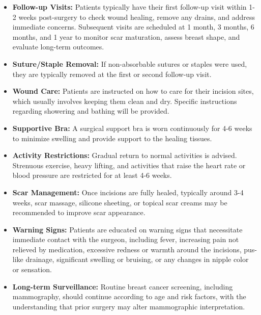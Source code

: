 \begin{itemize}
  \item \textbf{Follow-up Visits:} Patients typically have their first follow-up visit within 1-2 weeks post-surgery to check wound healing, remove any drains, and address immediate concerns. Subsequent visits are scheduled at 1 month, 3 months, 6 months, and 1 year to monitor scar maturation, assess breast shape, and evaluate long-term outcomes.
  \item \textbf{Suture/Staple Removal:} If non-absorbable sutures or staples were used, they are typically removed at the first or second follow-up visit.
  \item \textbf{Wound Care:} Patients are instructed on how to care for their incision sites, which usually involves keeping them clean and dry. Specific instructions regarding showering and bathing will be provided.
  \item \textbf{Supportive Bra:} A surgical support bra is worn continuously for 4-6 weeks to minimize swelling and provide support to the healing tissues.
  \item \textbf{Activity Restrictions:} Gradual return to normal activities is advised. Strenuous exercise, heavy lifting, and activities that raise the heart rate or blood pressure are restricted for at least 4-6 weeks.
  \item \textbf{Scar Management:} Once incisions are fully healed, typically around 3-4 weeks, scar massage, silicone sheeting, or topical scar creams may be recommended to improve scar appearance.
  \item \textbf{Warning Signs:} Patients are educated on warning signs that necessitate immediate contact with the surgeon, including fever, increasing pain not relieved by medication, excessive redness or warmth around the incisions, pus-like drainage, significant swelling or bruising, or any changes in nipple color or sensation.
  \item \textbf{Long-term Surveillance:} Routine breast cancer screening, including mammography, should continue according to age and risk factors, with the understanding that prior surgery may alter mammographic interpretation.
\end{itemize}

